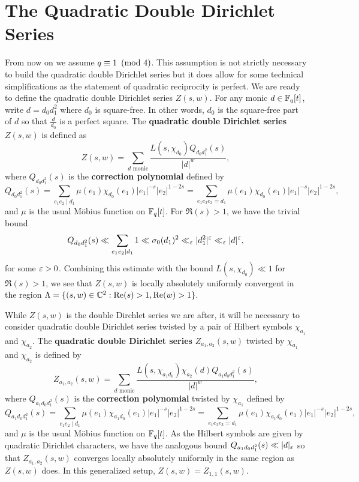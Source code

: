 \documentclass[12pt,reqno,oneside]{amsart}
\begin{document}
\section{The Quadratic Double Dirichlet Series}
    From now on we assume $q \equiv 1 \ \left(\text{mod }4\right)$. This assumption is not strictly necessary to build the quadratic double Dirichlet series but it does allow for some technical simplifications as the statement of quadratic reciprocity is perfect. We are ready to define the quadratic double Dirichlet series $Z(s,w)$. For any monic $d \in \mathbb{F}_{q}[t]$, write $d = d_{0}d_{1}^{2}$ where $d_{0}$ is square-free. In other words, $d_{0}$ is the square-free part of $d$ so that $\frac{d}{d_{0}}$ is a perfect square. The \textbf{quadratic double Dirichlet series} $Z(s,w)$ is defined as
    \[
        Z(s,w) = \sum_{\text{$d$ monic}}\frac{L(s,\chi_{d_{0}})Q_{d_{0}d_{1}^{2}}(s)}{|d|^{w}},
    \]
    where $Q_{d_{0}d_{1}^{2}}(s)$ is the \textbf{correction polynomial} defined by
    \[
        Q_{d_{0}d_{1}^{2}}(s) = \sum_{e_{1}e_{2} \mid d_{1}}\mu(e_{1})\chi_{d_{0}}(e_{1})|e_{1}|^{-s}|e_{2}|^{1-2s} = \sum_{e_{1}e_{2}e_{3} = d_{1}}\mu(e_{1})\chi_{d_{0}}(e_{1})|e_{1}|^{-s}|e_{2}|^{1-2s},
    \]
    and $\mu$ is the usual M\"obius function on $\mathbb{F}_{q}[t]$. For $\Re(s) > 1$, we have the trivial bound
    \[
        Q_{d_{0}d_{1}^{2}}(s) \ll \sum_{e_{1}e_{2} \mid d_{1}}1 \ll \sigma_{0}(d_{1})^{2} \ll_{\varepsilon} |d_{1}^{2}|^{\varepsilon} \ll_{\varepsilon} |d|^{\varepsilon},
    \]
    for some $\varepsilon > 0$. Combining this estimate with the bound $L(s,\chi_{d_{0}}) \ll 1$ for $\Re(s) > 1$, we see that $Z(s,w)$ is locally absolutely uniformly convergent in the region $\Lambda = \{(s,w) \in \mathbb{C}^{2}:\mathrm{Re}(s) > 1, \mathrm{Re}(w) > 1\}$.

    While $Z(s,w)$ is the double Dirchlet series we are after, it will be necessary to consider quadratic double Dirichlet series twisted by a pair of Hilbert symbols $\chi_{a_{1}}$ and $\chi_{a_{2}}$. The \textbf{quadratic double Dirichlet series} $Z_{a_{1},a_{2}}(s,w)$ twisted by $\chi_{a_{1}}$ and $\chi_{a_{2}}$ is defined by
    \[
        Z_{a_{1},a_{2}}(s,w) = \sum_{\text{$d$ monic}}\frac{L(s,\chi_{a_{1}d_{0}})\chi_{a_{2}}(d)Q_{a_{1}d_{0}d_{1}^{2}}(s)}{|d|^{w}},
    \]
    where $Q_{a_{1}d_{0}d_{1}^{2}}(s)$ is the \textbf{correction polynomial} twisted by $\chi_{a_{1}}$ defined by
    \[
        Q_{a_{1}d_{0}d_{1}^{2}}(s) = \sum_{e_{1}e_{2} \mid d_{1}}\mu(e_{1})\chi_{a_{1}d_{0}}(e_{1})|e_{1}|^{-s}|e_{2}|^{1-2s} = \sum_{e_{1}e_{2}e_{3} = d_{1}}\mu(e_{1})\chi_{a_{1}d_{0}}(e_{1})|e_{1}|^{-s}|e_{2}|^{1-2s},
    \]
    and $\mu$ is the usual M\"obius function on $\mathbb{F}_{q}[t]$. As the Hilbert symbols are given by quadratic Dirichlet characters, we have the analogous bound $Q_{a_{1}d_{0}d_{1}^{2}}(s) \ll |d|_{\varepsilon}$ so that $Z_{a_{1},a_{2}}(s,w)$ converges locally absolutely uniformly in the same region as $Z(s,w)$ does. In this generalized setup, $Z(s,w) = Z_{1,1}(s,w)$.
\end{document}
